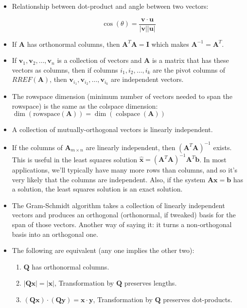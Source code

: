 \documentclass[main.tex]{subfiles}
\begin{document}
\begin{itemize}
        \item Relationship between dot-product and angle between two vectors:
        
        $$
        \cos (\theta)=\frac{\mathbf{v} \cdot \mathbf{u}}{|\mathbf{v}||\mathbf{u}|}
        $$
        
        \item If $\mathbf{A}$ has orthonormal columns, then $\mathbf{A}^{T} \mathbf{A}=\mathbf{I}$ which makes  $\mathbf{A}^{-1}=\mathbf{A}^{T}$.
        
        \item If $\mathbf{v}_{1}, \mathbf{v}_{2}, \ldots, \mathbf{v}_{n}$ is a collection of vectors and $\mathbf{A}$ is a matrix that has these vectors as columns, then if columns $i_{1}, i_{2}, \ldots, i_{k}$ are the pivot columns of $R R E F(\mathbf{A})$, then $\mathbf{v}_{i_{1}}, \mathbf{v}_{i_{2}}, \ldots, \mathbf{v}_{i_{k}}$ are independent vectors.
        
        \item The rowspace dimension (minimum number of vectors needed to span the rowspace) is the same as the colspace dimension: $\operatorname{dim}(\text{rowspace}(\mathbf{A}))=\operatorname{dim}(\operatorname{colspace}(\mathbf{A}))$
        
        \item A collection of mutually-orthogonal vectors is linearly independent.
        
        \item If the columns of $\mathbf{A}_{m \times n}$ are linearly independent, then $\left(\mathbf{A}^{T} \mathbf{A}\right)^{-1}$ exists. This is useful in the least squares solution $\hat{\mathbf{x}}=\left(\mathbf{A}^{T} \mathbf{A}\right)^{-1} \mathbf{A}^{T} \mathbf{b}$. In most applications, we'll typically have many more rows than columns, and so it's very likely that the columns are independent. Also, if the system $\mathbf{A x}=\mathbf{b}$ has a solution, the least squares solution is an exact solution.
        
        \item The Gram-Schmidt algorithm takes a collection of linearly independent vectors and produces an orthogonal (orthonormal, if tweaked) basis for the span of those vectors. Another way of saying it: it turns a non-orthogonal basis into an orthogonal one. 
        
        \item The following are equivalent (any one implies the other two):
        
        \begin{enumerate}
            \item $\mathbf{Q}$ has orthonormal columns.
            \item $|\mathbf{Q} \mathbf{x}|=|\mathbf{x}|$, Transformation by $\mathbf{Q}$ preserves lengths.
            \item $(\mathbf{Q x}) \cdot(\mathbf{Q y})=\mathbf{x} \cdot \mathbf{y}$, Transformation by $\mathbf{Q}$ preserves dot-products.
        \end{enumerate}
    
    \end{itemize}       
    
\end{document}
